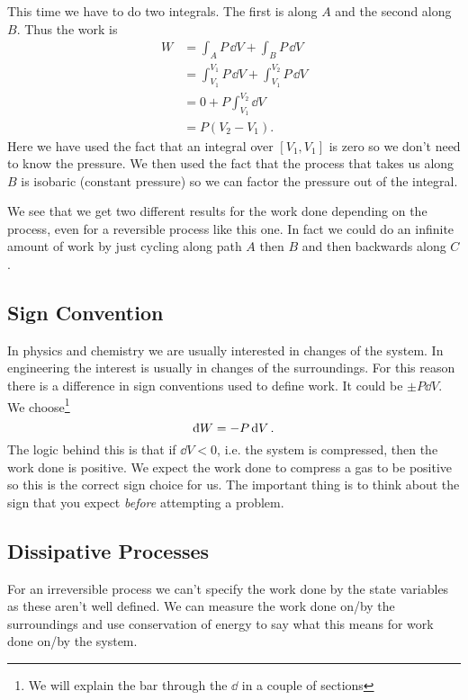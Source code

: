 \begin{example}
        This time we have to do two integrals.
        The first is along \(A\) and the second along \(B\).
        Thus the work is
        \begin{align*}
            W &= \int_A P\,\dd{V} + \int_B P\,\dd{V}\\
            &= \int_{V_1}^{V_1}P\,\dd{V} + \int_{V_1}^{V_2}P\,\dd{V}\\
            &= 0 + P\int_{V_1}^{V_2}\dd{V}\\
            &= P(V_2 - V_1).
        \end{align*}
        Here we have used the fact that an integral over \([V_1, V_1]\) is zero so we don't need to know the pressure.
        We then used the fact that the process that takes us along \(B\) is isobaric (constant pressure) so we can factor the pressure out of the integral.
        
        We see that we get two different results for the work done depending on the process, even for a reversible process like this one.
        In fact we could do an infinite amount of work by just cycling along path \(A\) then \(B\) and then backwards along \(C\).
    \end{example}
    
    \subsection{Sign Convention}
    In physics and chemistry we are usually interested in changes of the system.
    In engineering the interest is usually in changes of the surroundings.
    For this reason there is a difference in sign conventions used to define work.
    It could be \(\pm P\dd{V}\).
    We choose\footnote{We will explain the bar through the \(\dd\) in a couple of sections}
    \[\ddbar{W} = -P\dd{V}.\]
    The logic behind this is that if \(\dd{V} < 0\), i.e. the system is compressed, then the work done is positive.
    We expect the work done to compress a gas to be positive so this is the correct sign choice for us.
    The important thing is to think about the sign that you expect \emph{before} attempting a problem.
    
    \subsection{Dissipative Processes}
    For an irreversible process we can't specify the work done by the state variables as these aren't well defined.
    We can measure the work done on/by the surroundings and use conservation of energy to say what this means for work done on/by the system.
    
